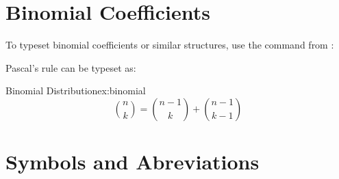 \section{Binomial Coefficients}

To typeset binomial coefficients or similar structures, use the command
\cmd{\binom} from :

Pascal's rule can be typeset as:


\begin{texexample}{Binomial Distribution}{ex:binomial}
\[
\binom{n}{k} =\binom{n-1}{k}
+ \binom{n-1}{k-1}
\]
\end{texexample}



\section[Symbols and Abbreviations]{Symbols and Abreviations}
\label{math:abbreviations}

\label{abbr}\label{symbols}%

